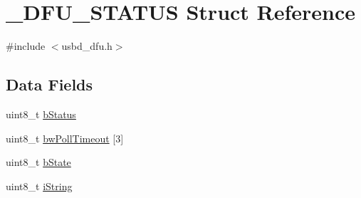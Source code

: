 \hypertarget{struct__DFU__STATUS}{\section{\-\_\-\-D\-F\-U\-\_\-\-S\-T\-A\-T\-U\-S Struct Reference}
\label{struct__DFU__STATUS}
}


{\ttfamily \#include $<$usbd\-\_\-dfu.\-h$>$}

\subsection*{Data Fields}
\begin{DoxyCompactItemize}
\item 
uint8\-\_\-t \hyperlink{struct__DFU__STATUS_a119f8cd204d5cac52dc10c5a05847c11}{b\-Status}
\item 
uint8\-\_\-t \hyperlink{struct__DFU__STATUS_acb250abf9daba1a07c7ec98cb0e89bfe}{bw\-Poll\-Timeout} \mbox{[}3\mbox{]}
\item 
uint8\-\_\-t \hyperlink{struct__DFU__STATUS_a0beec369f74d37d0e6329e3826e7b1ef}{b\-State}
\item 
uint8\-\_\-t \hyperlink{struct__DFU__STATUS_ab486ff4ce617b2808ec80d0188403aab}{i\-String}
\end{DoxyCompactItemize}


